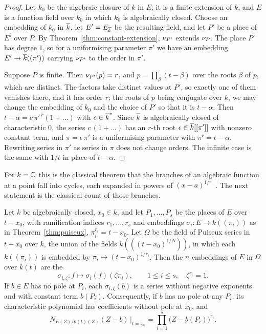 \begin{proof}
Let $k_0$ be the algebraic closure of $k$ in $E$; it is a finite extension of
$k$, and $E$ is a function field over $k_0$ in which $k_0$ is algebraically
closed. Choose an embedding of $k_0$ in $\overline{k}$, let $E' = E_{\overline{k}}$ be the
resulting field, and let $P'$ be a place of $E'$ over $P$. By
Theorem~\ref{thm:constant-extension}, $\nu_{P'}$ extends $\nu_{P}$. The place
$P'$ has degree $1$, so for a uniformising parameter $\pi'$ we have an
embedding $E' \to \overline{k}((\pi'))$ carrying $\nu_{P'}$ to the order in $\pi'$.

Suppose $P$ is finite. Then $\nu_{P'}(p) = r$, and $p = \prod_\beta (t -
\beta)$ over the roots $\beta$ of $p$, which are distinct. The factors take
distinct values at $P'$, so exactly one of them vanishes there, and it has
order $r$; the roots of $p$ being conjugate over $k$, we may change the
embedding of $k_0$ and the choice of $P'$ so that it is $t - \alpha$. Then $t
- \alpha = c\, \pi'^{\,r} (1 + \dots)$ with $c \in \overline{k}^*$. Since $\overline{k}$ is
algebraically closed of characteristic $0$, the series $c\,(1 + \dots)$ has an
$r$-th root $\epsilon \in \overline{k}[[\pi']]$ with nonzero constant term, and $\pi
= \epsilon\, \pi'$ is a uniformising parameter with $\pi^r = t - \alpha$.
Rewriting series in $\pi'$ as series in $\pi$ does not change orders. The
infinite case is the same with $1/t$ in place of $t - \alpha$.
\end{proof}

For $k = \mathbb{C}$ this is the classical theorem that the branches of an algebraic
function at a point fall into cycles, each expanded in powers of $(x -
a)^{1/r}$~\cite[\S13]{bliss1933}. The next statement is the classical count
of those branches.

\begin{theorem}\label{thm:puiseux-embeddings}
Let $k$ be algebraically closed, $x_0 \in k$, and let $P_1, \dots, P_s$ be the
places of $E$ over $t - x_0$, with ramification indices $r_1, \dots, r_s$ and
embeddings $\sigma_i : E \to k((\pi_i))$ as in Theorem~\ref{thm:puiseux},
$\pi_i^{r_i} = t - x_0$. Let $\Omega$ be the field of Puiseux series in $t -
x_0$ over $k$, the union of the fields $k(((t - x_0)^{1/N}))$, in which each
$k((\pi_i))$ is embedded by $\pi_i \mapsto (t - x_0)^{1/r_i}$. Then the $n$
embeddings of $E$ in $\Omega$ over $k(t)$ are the
\[
  \sigma_{i, \zeta} : f \longmapsto \sigma_i(f)(\zeta \pi_i),
  \qquad 1 \le i \le s, \quad \zeta^{r_i} = 1 .
\]
If $b \in E$ has no pole at $P_i$, each $\sigma_{i,\zeta}(b)$ is a series
without negative exponents and with constant term $b(P_i)$. Consequently, if
$b$ has no pole at any $P_i$, its characteristic polynomial has coefficients
without pole at $x_0$, and
\[
  N_{E(Z)/k(t)(Z)}(Z - b)\, \big|_{t = x_0} = \prod_{i=1}^s \bigl( Z - b(P_i) \bigr)^{r_i} .
\]
\end{theorem}


